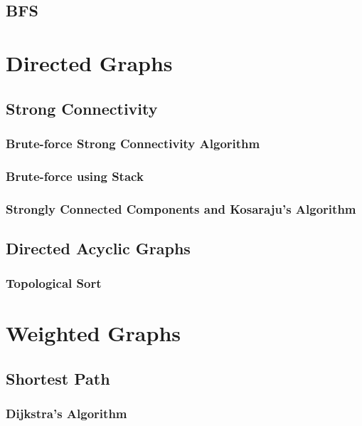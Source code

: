 \documentclass{report}
\begin{document}
\section{BFS}


\chapter{Directed Graphs}

\section{Strong Connectivity}

\subsection{Brute-force Strong Connectivity Algorithm}

\subsection{Brute-force using Stack}

\subsection{Strongly Connected Components and Kosaraju's Algorithm}

\section{Directed Acyclic Graphs}

\subsection{Topological Sort}


\chapter{Weighted Graphs}

\section{Shortest Path}

\subsection{Dijkstra's Algorithm}
\end{document}
